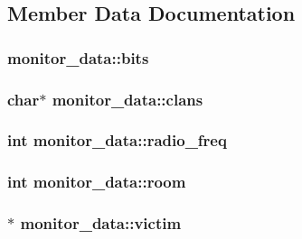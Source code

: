 \subsection{Member Data Documentation}
\hypertarget{structmonitor__data_a3ec9b1079db7db15fbf7b1951c821d71}{
\subsubsection[{bits}]{ monitor\-\_\-data\-::bits}}\label{structmonitor__data_a3ec9b1079db7db15fbf7b1951c821d71}
\hypertarget{structmonitor__data_a25333cb59bdd5b479dc0a1453a2731e4}{
\subsubsection[{clans}]{\setlength{\rightskip}{0pt plus 5cm}char$\ast$ monitor\-\_\-data\-::clans}}\label{structmonitor__data_a25333cb59bdd5b479dc0a1453a2731e4}
\hypertarget{structmonitor__data_ae2e00742ec116637315a806ed859a3f1}{
\subsubsection[{radio\-\_\-freq}]{\setlength{\rightskip}{0pt plus 5cm}int monitor\-\_\-data\-::radio\-\_\-freq}}\label{structmonitor__data_ae2e00742ec116637315a806ed859a3f1}
\hypertarget{structmonitor__data_a02cef827d5a5d9f5f19d57dd1b758c40}{
\subsubsection[{room}]{\setlength{\rightskip}{0pt plus 5cm}int monitor\-\_\-data\-::room}}\label{structmonitor__data_a02cef827d5a5d9f5f19d57dd1b758c40}
\hypertarget{structmonitor__data_a7f3c3cbd9ec994d88d2ef6cc2cf87966}{
\subsubsection[{victim}]{$\ast$ monitor\-\_\-data\-::victim}}\label{structmonitor__data_a7f3c3cbd9ec994d88d2ef6cc2cf87966}
